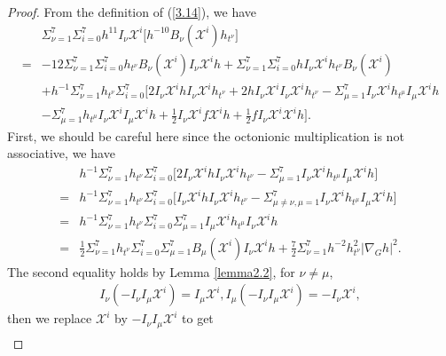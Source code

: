 \documentclass[reqno,12pt]{amsart}
\numberwithin{equation}{section}
\theoremstyle{plain}
\theoremstyle{definition}
\begin{document}
\begin{proof}
From the definition of (\ref{3.14}), we have
\begin{equation}
    \begin{aligned}
    &\Sigma_{\nu=1}^7\Sigma_{i=0}^7h^{11}I_\nu\mathscr{X}^i \bigg[h^{-10}B_\nu(\mathscr{X}^i)h_{t^\nu}\bigg]\\=&-12\Sigma_{\nu=1}^7\Sigma_{i=0}^7h_{t^\nu}B_\nu(\mathscr{X}^i)I_\nu\mathscr{X}^i h+\Sigma_{\nu=1}^7\Sigma_{i=0}^7 hI_\nu\mathscr{X}^i h_{t^\nu}B_\nu(\mathscr{X}^i)\\&+h^{-1}\Sigma_{\nu=1}^7h_{t^\nu}\Sigma_{i=0}^7\bigg[2I_\nu\mathscr{X}^i h I_\nu\mathscr{X}^i h_{t^\nu}+2h I_\nu\mathscr{X}^i I_\nu\mathscr{X}^i h_{t^\nu}-\Sigma_{\mu=1}^7I_\nu\mathscr{X}^ih_{t^\mu}I_\mu\mathscr{X}^i h\\&-\Sigma_{\mu=1}^7h_{t^\mu}I_\nu\mathscr{X}^iI_\mu\mathscr{X}^i h+\frac{1}{2}I_\nu\mathscr{X}^i f\mathscr{X}^i h+\frac{1}{2}fI_\nu\mathscr{X}^i\mathscr{X}^i h\bigg].
\end{aligned}\end{equation}
First, we should be careful here since the octonionic multiplication is not associative, we have
\begin{equation}
    \begin{aligned}
&h^{-1}\Sigma_{\nu=1}^7h_{t^\nu}\Sigma_{i=0}^7\bigg[2I_\nu\mathscr{X}^i h I_\nu\mathscr{X}^i h_{t^\nu}-\Sigma_{\mu=1}^7I_\nu\mathscr{X}^i h_{t^\mu}I_\mu\mathscr{X}^i h\bigg]\\=&h^{-1}\Sigma_{\nu=1}^7h_{t^{\nu}}\Sigma_{i=0}^7\bigg[I_\nu\mathscr{X}^i h I_\nu\mathscr{X}^i h_{t^\nu}-\Sigma_{\mu\neq \nu,\mu=1}^7I_\nu\mathscr{X}^i h_{t^\mu}I_\mu\mathscr{X}^i h \bigg]\\=&h^{-1}\Sigma_{\nu=1}^7h_{t^\nu}\Sigma_{i=0}^7 \Sigma_{\mu=1}^7I_{\mu}\mathscr{X}^i h_{t^\mu}I_\nu\mathscr{X}^i h\\=&\frac{1}{2}\Sigma_{\nu=1}^7h_{t^\nu}\Sigma_{i=0}^7\Sigma_{\mu=1}^7 B_\mu(\mathscr{X}^i)I_\nu\mathscr{X}^i h+\frac{7}{2}\Sigma_{\nu=1}^7h^{-2}h_{t^\nu}^2|\nabla_G h|^2.
 \end{aligned}
\end{equation}
The second equality holds by Lemma \ref{lemma2.2}, for $\nu\neq \mu$,
\begin{align*}
    I_\nu(-I_\nu I_\mu\mathscr{X}^i)=I_\mu \mathscr{X}^i, I_\mu(-I_\nu I_\mu\mathscr{X}^i)=-I_\nu\mathscr{X}^i,
\end{align*}
then we replace $\mathscr{X}^i$ by $-I_\nu I_\mu \mathscr{X}^i$ to get
\begin{align*}

\end{align*}
\end{proof}
\end{document}
